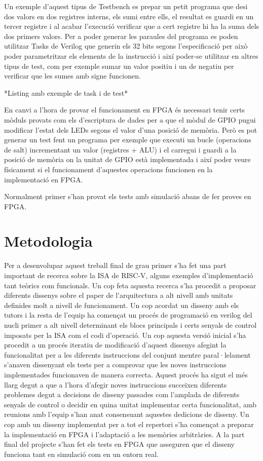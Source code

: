 \documentclass[10pt,a4paper,twocolumn,twoside]{article}
\begin{document}
Un exemple d'aquest tipus de Testbench es prepar un petit programa que desi dos valors en dos registres interns, els sumi entre ells, el resultat es guardi en un tercer registre i al acabar l'execució verificar que a cert registre hi ha la suma dels dos primers valors. Per a poder generar les paraules del programa es poden utilitzar Tasks de Verilog que generin els 32 bits segons l'especificació per això poder parametritzar els elements de la instrucció i així poder-se utilitzar en altres tipus de test, com per exemple sumar un valor positiu i un de negatiu per verificar que les sumes amb signe funcionen. 

*Listing amb exemple de task i de test*

En canvi a l'hora de provar el funcionament en FPGA és necessari tenir certs mòduls provats com els d'escriptura de dades per a que el mòdul de GPIO pugui modificar l'estat dels LEDs segons el valor d'una posició de memòria. Però es pot generar un test fent un programa per exemple que executi un bucle (operacions de salt) incrementant un valor (registres + ALU) i el carregui i guardi a la posició de memòria on la unitat de GPIO està implementada i així poder veure físicament si el funcionament d'aquestes operacions funcionen en la implementació en FPGA. 

Normalment primer s'han provat els tests amb simulació abans de fer proves en FPGA.


\section{Metodologia}

Per a desenvolupar aquest treball final de grau primer s'ha fet una part important de recerca sobre la ISA de RISC-V, alguns exemples d'implementació tant teòrics com funcionals. Un cop feta aquesta recerca s'ha procedit a proposar diferents dissenys sobre el paper de l'arquitectura a alt nivell amb unitats definides molt a nivell de funcionament. Un cop acordat un disseny amb els tutors i la resta de l'equip ha començat un procés de programació en verilog del nucli primer a alt nivell determinant els blocs principals i certs senyals de control imposats per la ISA com el codi d'operació. Un cop aquesta versió inicial s'ha procedit a un procés iteratiu de modificació d'aquest dissenys afegint la funcionalitat per a les diferents instruccions del conjunt mentre paral·lelament s'anaven dissenyant els tests per a comprovar que les noves instruccions implementades funcionaven de manera correcta. Aquest procés ha sigut el més llarg degut a que a l'hora d'afegir noves instruccions succeïxen diferents problemes degut a decisions de disseny passades com l'amplada de diferents senyals de control o decidir en quina unitat implementar certa funcionalitat, amb reunions amb l'equip s'han anat consensuant aquestes dedicions de disseny. Un cop amb un disseny implementat per a tot el repertori s'ha començat a preparar la implementació en FPGA i l'adaptació a les memòries arbitràries. A la part final del projecte s'han fet els tests en FPGA que asseguren que el disseny funciona tant en simulació com en un entorn real.
\end{document}
